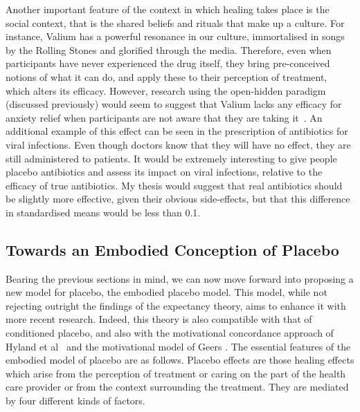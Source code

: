 Another important feature of the context in which healing takes place is the social context, that is the shared beliefs and rituals that make up a culture. For instance, Valium has a powerful resonance in our culture, immortalised in songs by the Rolling Stones and glorified through the media. Therefore, even when participants have never experienced the drug itself, they bring pre-conceived notions of what it can do, and apply these to their perception of treatment, which alters its efficacy. However, research using the open-hidden paradigm (discussed previously) would seem to suggest that Valium lacks any efficacy for anxiety relief when participants are not aware that they are taking it~\cite{benedetti2003}. An additional example of this effect can be seen in the prescription of antibiotics for viral infections. Even though doctors know that they will have no effect, they are still administered to patients. It would be extremely interesting to give people placebo antibiotics and assess its impact on viral infections, relative to the efficacy of true antibiotics. My thesis would suggest that real antibiotics should be slightly more effective, given their obvious side-effects, but that this difference in standardised means would be less than 0.1. 


\subsection{Towards an Embodied Conception of Placebo}
\label{sec:towards-an-embodied}
Bearing the previous sections in mind, we can now move forward into proposing a new model for placebo, the embodied placebo model. This model, while not rejecting outright the findings of the expectancy theory, aims to enhance it with more recent research. Indeed, this theory is also compatible with that of conditioned placebo, and also with the motivational concordance approach of Hyland et al~\cite{Hyland2007} and the motivational model of Geers \cite{Geers2005}.
The essential features of the embodied model of placebo are as follows. Placebo effects are those healing effects which arise from the perception of treatment or caring on the part of the health care provider or from the context surrounding the treatment. They are mediated by four different kinds of factors.


